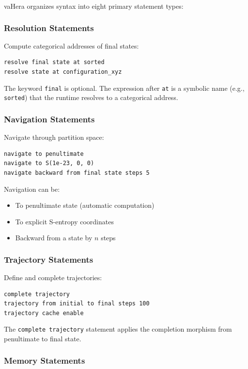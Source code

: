 \documentclass[twocolumn,10pt]{article}
\theoremstyle{definition}
\theoremstyle{remark}
\begin{document}
vaHera organizes syntax into eight primary statement types:

\subsubsection{Resolution Statements}

Compute categorical addresses of final states:
\begin{lstlisting}
resolve final state at sorted
resolve state at configuration_xyz
\end{lstlisting}

The keyword \texttt{final} is optional. The expression after \texttt{at} is a symbolic name (e.g., \texttt{sorted}) that the runtime resolves to a categorical address.

\subsubsection{Navigation Statements}

Navigate through partition space:
\begin{lstlisting}
navigate to penultimate
navigate to S(1e-23, 0, 0)
navigate backward from final state steps 5
\end{lstlisting}

Navigation can be:
\begin{itemize}
    \item To penultimate state (automatic computation)
    \item To explicit S-entropy coordinates
    \item Backward from a state by $n$ steps
\end{itemize}

\subsubsection{Trajectory Statements}

Define and complete trajectories:
\begin{lstlisting}
complete trajectory
trajectory from initial to final steps 100
trajectory cache enable
\end{lstlisting}

The \texttt{complete trajectory} statement applies the completion morphism from penultimate to final state.

\subsubsection{Memory Statements}
\end{document}
